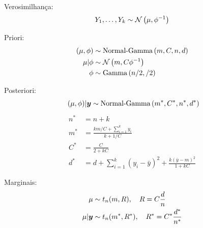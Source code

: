 \begin{theorem}
	\leavevmode 
	\begin{outline}
		\1 Verosimilhança: 
		\[ Y_1, \ldots, Y_k \sim \normdist{\mu, \phi^{-1}}\]
		
		\1 Priori:
		\begin{align}
			(\mu,\phi) &\sim \ngdist{m, C, n, d} \\
			\mu|\phi &\sim \normdist{m, C\phi^{-1}} \\
			\phi &\sim \gammadist{n/2, /2}
		\end{align}
		
		\1 Posteriori: \[ \ (\mu,\phi)|\bm{y} \sim \operatorname{Normal-Gamma}\left(m^*, C^*, n^*, d^*\right)\]
		\begin{align}
			n^* &= n+k \\
			m^* &= \frac{km/C+\sum_{i=1}^{k}y_i}{k+1/C} \\
			C^* &= \frac{C}{2+kC} \\
			d^* &= d + \sum_{i=1}^{k}(y_i-\bar{y})^2 + \frac{k(\bar{y}-m)^2}{1+kC}
		\end{align}	
		
		\1 Marginais:
		\begin{align}
			\mu &\sim t_{n}(m,R), \quad R=C\frac{d}{n} \\
			\mu|\bm{y} &\sim t_{n}(m^*, R^*), \quad R^*=C^*\frac{d^*}{n^*}
		\end{align}
	\end{outline}
\end{theorem}

